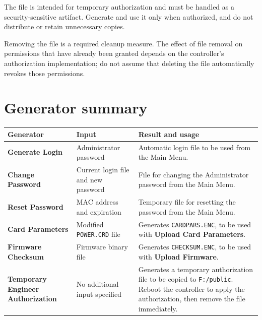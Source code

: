 ﻿\documentclass[11pt,a4paper]{article}
\newcommand{\button}[1]{\textbf{#1}}
\newcommand{\filename}[1]{\texttt{#1}}
\begin{document}
The file is intended for temporary authorization and must be
handled as a security-sensitive artifact. Generate and use it
only when authorized, and do not distribute or retain unnecessary
copies.

Removing the file is a required cleanup measure. The effect of
file removal on permissions that have already been granted depends
on the controller's authorization implementation; do not assume
that deleting the file automatically revokes those permissions.

\section{Generator summary}

\renewcommand{\arraystretch}{1.4}

\begin{longtable}{p{3.2cm} p{4.2cm} p{5.2cm}}
\toprule
\textbf{Generator} &
\textbf{Input} &
\textbf{Result and usage} \\
\midrule
\endhead

\button{Generate Login} &
Administrator password &
Automatic login file to be used from the Main Menu. \\

\button{Change Password} &
Current login file and new password &
File for changing the Administrator password from the Main Menu. \\

\button{Reset Password} &
MAC address and expiration &
Temporary file for resetting the password from the Main Menu. \\

\button{Card Parameters} &
Modified \filename{POWER.CRD} file &
Generates \filename{CARDPARS.ENC}, to be used with
\button{Upload Card Parameters}. \\

\button{Firmware Checksum} &
Firmware binary file &
Generates \filename{CHECKSUM.ENC}, to be used with
\button{Upload Firmware}. \\

\button{Temporary Engineer Authorization} &
No additional input specified &
Generates a temporary authorization file to be copied to
\filename{F:/public}. Reboot the controller to apply the
authorization, then remove the file immediately. \\

\bottomrule
\end{longtable}
\end{document}
